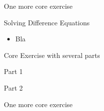 \bookonlynewpage


\question
	One more core exercise





%
%



\begin{module}{Solving Difference Equations}
	\label{diff:solve}

	
	
\end{module}



\begin{lesson}

	\begin{itemize}
		\item Bla
	\end{itemize}
	

\end{lesson}


\newpage

\question
	Core Exercise with several parts
\begin{parts}
	\item Part 1
	\item Part 2
\end{parts}

\bookonlynewpage


\question
	One more core exercise




%
%
%
%
%
%
%
%	
%	
%
%
%
%
%	
%
%
%
%
%
%
%
%
%





